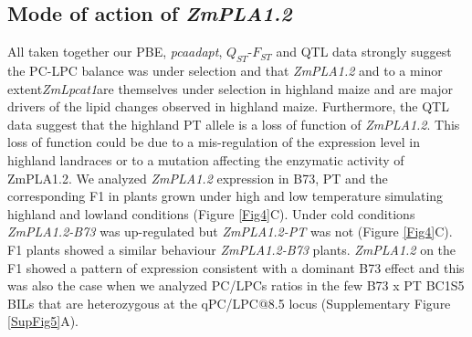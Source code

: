 \documentclass[9pt,twocolumn,twoside]{BioRxiv}
\begin{document}
\subsection{Mode of action of \textit{ZmPLA1.2}} 
All taken together our PBE, \textit{pcaadapt}, $Q_{ST}$-$F_{ST}$ and QTL data strongly suggest the PC-LPC balance was under selection and that \textit{ZmPLA1.2} and to a minor extent\textit{ZmLpcat1}are themselves under selection in highland maize and are major drivers of the lipid changes observed in highland maize. 
Furthermore, the QTL data suggest that the highland PT allele is a loss of function of \textit{ZmPLA1.2}. 
This loss of function could be due to a mis-regulation of the expression level in highland landraces or to a mutation affecting the enzymatic activity of ZmPLA1.2. 
We analyzed \textit{ZmPLA1.2} expression in B73, PT and the corresponding F1 in plants grown under high and low temperature simulating highland and lowland conditions (Figure \ref{Fig4}C). 
Under cold conditions \textit{ZmPLA1.2-B73} was up-regulated but \textit{ZmPLA1.2-PT} was not (Figure \ref{Fig4}C). 
F1 plants showed a similar behaviour \textit{ZmPLA1.2-B73} plants.
\textit{ZmPLA1.2} on the F1 showed a pattern of expression consistent with a dominant B73 effect and this was also the case when we analyzed PC/LPCs ratios in the few B73 x PT BC1S5 BILs that are heterozygous at the qPC/LPC@8.5 locus (Supplementary Figure \ref{SupFig5}A).
\end{document}
